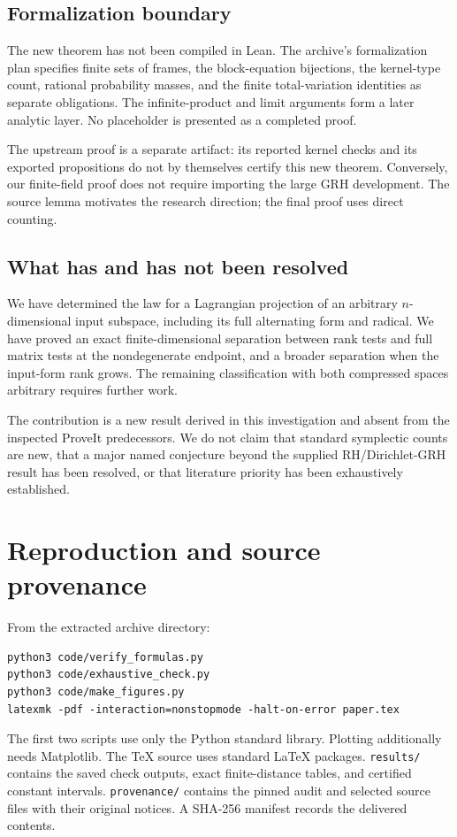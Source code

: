 \documentclass[11pt]{article}
\newcommand{\1}{\mathbf 1}
\theoremstyle{definition}
\theoremstyle{remark}
\numberwithin{equation}{section}
\begin{document}
\subsection{Formalization boundary}
The new theorem has not been compiled in Lean. The archive's formalization plan specifies finite sets of frames, the block-equation bijections, the kernel-type count, rational probability masses, and the finite total-variation identities as separate obligations. The infinite-product and limit arguments form a later analytic layer. No placeholder is presented as a completed proof.

The upstream proof is a separate artifact: its reported kernel checks and its exported propositions do not by themselves certify this new theorem. Conversely, our finite-field proof does not require importing the large GRH development. The source lemma motivates the research direction; the final proof uses direct counting.

\subsection{What has and has not been resolved}
We have determined the law for a Lagrangian projection of an arbitrary $n$-dimensional input subspace, including its full alternating form and radical. We have proved an exact finite-dimensional separation between rank tests and full matrix tests at the nondegenerate endpoint, and a broader separation when the input-form rank grows. The remaining classification with both compressed spaces arbitrary requires further work.

The contribution is a new result derived in this investigation and absent from the inspected ProveIt predecessors. We do not claim that standard symplectic counts are new, that a major named conjecture beyond the supplied RH/Dirichlet-GRH result has been resolved, or that literature priority has been exhaustively established.

\appendix
\section{Reproduction and source provenance}
From the extracted archive directory:
\begin{verbatim}
python3 code/verify_formulas.py
python3 code/exhaustive_check.py
python3 code/make_figures.py
latexmk -pdf -interaction=nonstopmode -halt-on-error paper.tex
\end{verbatim}
The first two scripts use only the Python standard library. Plotting additionally needs Matplotlib. The TeX source uses standard LaTeX packages. \texttt{results/} contains the saved check outputs, exact finite-distance tables, and certified constant intervals. \texttt{provenance/} contains the pinned audit and selected source files with their original notices. A SHA-256 manifest records the delivered contents.
\end{document}
